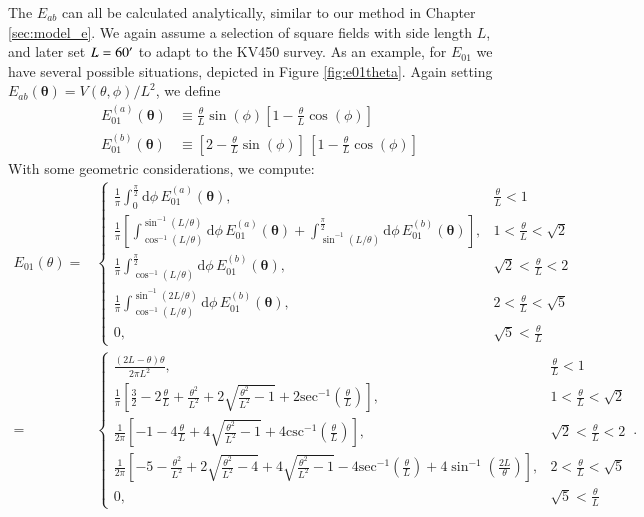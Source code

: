 \documentclass[referee]{aa} %
\renewcommand{\[}{\begin{equation}}
\renewcommand{\]}{\end{equation}}
\renewcommand{\rm}{\mathrm}
\def\inv{^{-1}}
\def\b#1{\bm{#1}}
\def\d{\rm{d}}
\begin{document}
\begin{appendix}
The $E_{ab}$ can all be calculated analytically, similar to our method in Chapter \ref{sec:model_e}. We again assume a selection of square fields with side length $L$, and later set $L=60^\prime$ to adapt to the KV450 survey. As an example, for $E_{01}$ we have several possible situations, depicted in Figure \ref{fig:e01theta}. Again setting $E_{ab}(\b\theta) = V(\theta,\phi)/L^2$, we define \begin{align}
E_{01}^{(a)}(\b\theta) & \equiv \frac{\theta}{L}\sin(\phi)[1-\frac{\theta}{L}\cos(\phi)] \nonumber\\
E_{01}^{(b)}(\b\theta) & \equiv [2-\frac{\theta}{L}\sin(\phi)]\, [1-\frac{\theta}{L}\cos(\phi)]
\end{align}
With some geometric considerations, we compute:
{
\begingroup
\addtolength{\jot}{1em}
\begin{align}
E_{01}(\theta) = & \begin{cases}
\frac{1}{\pi}\int_0^{\frac{\pi}{2}} \d\phi\, E_{01}^{(a)}(\b\theta), & \frac{\theta}{L} < 1 \\[10pt]
 \frac{1}{\pi}  \left[\int_{\cos\inv(L/\theta)}^{\sin\inv(L/\theta)}\d\phi\,E_{01}^{(a)}(\b\theta) + \int_{\sin\inv(L/\theta)}^{\frac{\pi}{2}}\d\phi\, E_{01}^{(b)}(\b\theta) \right],  & 1 < \frac{\theta}{L} < \sqrt{2} \\[10pt]
 \frac{1}{\pi} \int_{\cos\inv(L/\theta)}^{\frac{\pi}{2}}\d\phi\, E_{01}^{(b)}(\b\theta), & \sqrt{2}<\frac{\theta}{L}<2 \\[10pt]
\frac{1}{\pi} \int_{\cos\inv(L/\theta)}^{\sin\inv(2L/\theta)}\d\phi\, E_{01}^{(b)}(\b\theta), & 2<\frac{\theta}{L}<\sqrt{5} \\[10pt]
 0, & \sqrt{5}<\frac{\theta}{L}
\end{cases}\nonumber\\
 = & \begin{cases}
 \frac{(2L-\theta)\theta}{2\pi L^2}, & \frac{\theta}{L} < 1 \\[10pt]
 \frac{1}{\pi}\left[\frac{3}{2}- 2\frac{\theta}{L}+\frac{\theta^2}{L^2}+2\sqrt{\frac{\theta^2}{L^2}-1}+2\rm{sec\inv}\left(\frac{\theta}{L}\right)\right], & 1<\frac{\theta}{L}<\sqrt{2} \\[10pt]
 \frac{1}{2\pi}\left[-1-4\frac{\theta}{L}+4\sqrt{\frac{\theta^2}{L^2}-1}+4\rm{csc\inv}\left(\frac{\theta}{L}\right)\right], & \sqrt{2} < \frac{\theta}{L} < 2 \\[10pt]
 \frac{1}{2\pi}\left[-5-\frac{\theta^2}{L^2}+2\sqrt{\frac{\theta^2}{L^2}-4}+4\sqrt{\frac{\theta^2}{L^2}-1}-4\rm{sec\inv}\left(\frac{\theta}{L}\right)+4\sin\inv\left(\frac{2L}{\theta}\right)\right], & 2 < \frac{\theta}{L} < \sqrt{5} \\[10pt]
 0, & \sqrt{5}<\frac{\theta}{L}
 \end{cases}\, .
\end{align}
\endgroup
}


\end{appendix}
\end{document}
